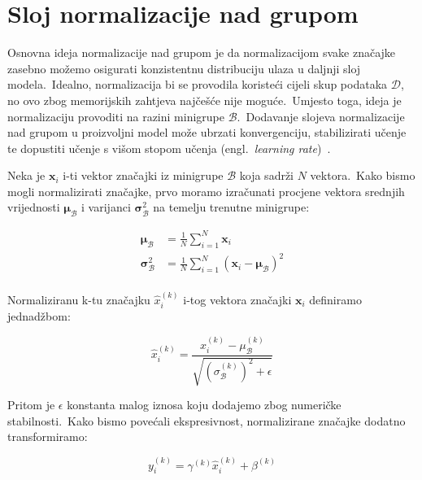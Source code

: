 \documentclass[diplomskirad]{fer}
\begin{document}
\section{Sloj normalizacije nad grupom}
\label{sek:norm_nad_grupom}

Osnovna ideja normalizacije nad grupom je da normalizacijom svake značajke zasebno možemo osigurati konzistentnu distribuciju ulaza u daljnji sloj modela.\ 
Idealno, normalizacija bi se provodila koristeći cijeli skup podataka $\mathcal{D}$, no ovo zbog memorijskih zahtjeva najčešće nije moguće.\ Umjesto toga, ideja je normalizaciju provoditi na razini minigrupe $\mathcal{B}$.\ 
Dodavanje slojeva normalizacije nad grupom u proizvoljni model može ubrzati konvergenciju, stabilizirati učenje te dopustiti učenje s višom stopom učenja (engl.\ \textit{learning rate})~\cite{ioffe2015batch}.\ 

\pagebreak

Neka je $\bm{x}_i$ i-ti vektor značajki iz minigrupe $\mathcal{B}$ koja sadrži $N$ vektora.\ Kako bismo mogli normalizirati značajke, prvo moramo izračunati procjene vektora srednjih vrijednosti $\bm{\mu}_{\mathcal{B}}$ i varijanci $\bm{\sigma}_{\mathcal{B}}^2$ na temelju trenutne minigrupe:

\begin{equation}
  \begin{aligned}
    \bm{\mu}_{\mathcal{B}} &= \frac{1}{N} \sum_{i=1}^{N} \bm{x}_i \\
    \bm{\sigma}_{\mathcal{B}}^2 &= \frac{1}{N} \sum_{i=1}^{N} (\bm{x}_i - \bm{\mu}_{\mathcal{B}})^2 \\
  \end{aligned}
  \label{eq:batch_norm_stats}
\end{equation}

Normaliziranu k-tu značajku $\hat{x}_i^{(k)}$ i-tog vektora značajki $\bm{x}_i$ definiramo jednadžbom:

\begin{equation}
  \hat{x}_i^{(k)} = \frac{x_i^{(k)} - \mu_{\mathcal{B}}^{(k)}}{\sqrt{(\sigma_{\mathcal{B}}^{(k)})^2 + \epsilon}}
  \label{eq:batch_norm}
\end{equation}

Pritom je $\epsilon$ konstanta malog iznosa koju dodajemo zbog numeričke stabilnosti.\ Kako bismo povećali ekspresivnost, normalizirane značajke dodatno transformiramo:

\begin{equation}
  y_i^{(k)} = \gamma^{(k)} \hat{x}_i^{(k)} + \beta^{(k)}
  \label{eq:batch_norm_scaling}
\end{equation}
\end{document}
